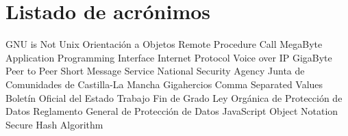 \chapter{Listado de acrónimos}

{\small
\begin{acronym}[XXXXXXXX]
       {\acs{GNU} is Not Unix}
        {Orientación a Objetos}
       {Remote Procedure Call}
        {MegaByte}
       {Application Programming Interface}
        {Internet Protocol}
      {Voice over \acs{IP}}
        {GigaByte}
       {Peer to Peer}
       {Short Message Service}
       {National Security Agency}
      {Junta de Comunidades de Castilla-La Mancha}
  	 {Gigahercios}
       {Comma Separated Values}
       {Boletín Oficial del Estado}
       {Trabajo Fin de Grado}
     {Ley Orgánica de Protección de Datos}
    {Reglamento General de Protección de Datos}
    {JavaScript Object Notation}
      {Secure Hash Algorithm}
\end{acronym}
}




